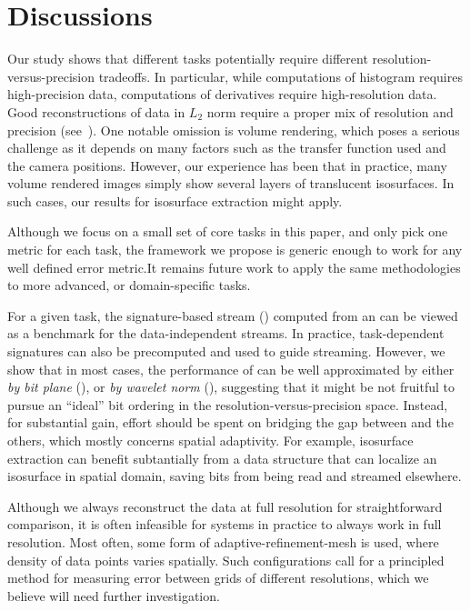 \section{Discussions}

Our study shows that different tasks potentially require different resolution-versus-precision
tradeoffs. In particular, while computations of histogram requires high-precision data, computations
of derivatives require high-resolution data. Good reconstructions of data in $L_2$ norm require a
proper mix of resolution and precision (see~). One notable omission is volume
rendering, which poses a serious challenge as it depends on many factors such as the transfer
function used and the camera positions. However, our experience has been that in practice, many
volume rendered images simply show several layers of translucent isosurfaces. In such cases, our
results for isosurface extraction might apply.

Although we focus on a small set of core tasks in this paper, and only pick one metric for each
task, the framework we propose is generic enough to work for any well defined error metric.It
remains future work to apply the same methodologies to more advanced, or domain-specific tasks.

For a given task, the signature-based stream (\ssig) computed from an \sopt can be viewed as a
benchmark for the data-independent streams. In practice, task-dependent signatures can also be
precomputed and used to guide streaming. However, we show that in most cases, the performance of
\ssig can be well approximated by either \emph{by bit plane} (\sbit), or \emph{by wavelet norm}
(\swav), suggesting that it might be not fruitful to pursue an ``ideal'' bit ordering in the
resolution-versus-precision space. Instead, for substantial gain, effort should be spent on bridging
the gap between \sopt and the others, which mostly concerns spatial adaptivity. For example,
isosurface extraction can benefit subtantially from a data structure that can localize an isosurface
in spatial domain, saving bits from being read and streamed elsewhere.

Although we always reconstruct the data at full resolution for straightforward comparison, it is
often infeasible for systems in practice to always work in full resolution. Most often, some form of
adaptive-refinement-mesh is used, where density of data points varies spatially. Such configurations
call for a principled method for measuring error between grids of different resolutions, which we
believe will need further investigation.

